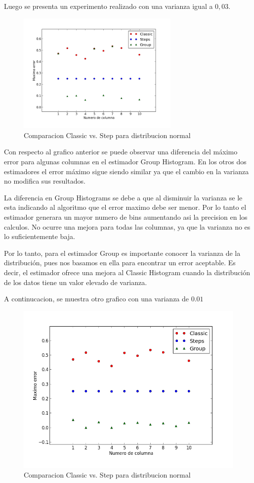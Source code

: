 \documentclass[10pt, a4paper,english,spanish,hidelinks]{article}
\begin{document}
Luego se presenta un experimento realizado con una varianza igual a $0,03$. 
\newpage
\begin{figure}
  \centering
  \includegraphics[width=0.7\textwidth]{./imagenes/ejb2_normal_t_003.png}
  \caption{Comparacion Classic vs. Step para distribucion normal}
\end{figure}

Con respecto al grafico anterior se puede observar una diferencia del máximo error para algunas columnas en el estimador Group Histogram. En los otros dos estimadores el error máximo sigue siendo similar ya que el cambio en la varianza no modifica sus resultados. 

La diferencia en Group Histograms se debe a que al disminuir la varianza se le esta indicando al algoritmo que el error maximo debe ser menor. Por lo tanto el estimador generara un mayor numero de bins aumentando asi la precision en los calculos. No ocurre una mejora para todas las columnas, ya que la varianza no es lo suficientemente baja. 

Por lo tanto, para el estimador Group es importante conocer la varianza de la distribución, pues nos
basamos en ella para encontrar un error aceptable. Es decir, el estimador ofrece una mejora al Classic Histogram cuando la distribución de los datos tiene un valor elevado de varianza.

A continucacion, se muestra otro grafico con una varianza de $0.01$
\newpage
\begin{figure}
  \centering
  \includegraphics[scale=0.6]{./imagenes/ejb2_normal_t_001.png}
  \caption{Comparacion Classic vs. Step para distribucion normal}
\end{figure}
\end{document}
